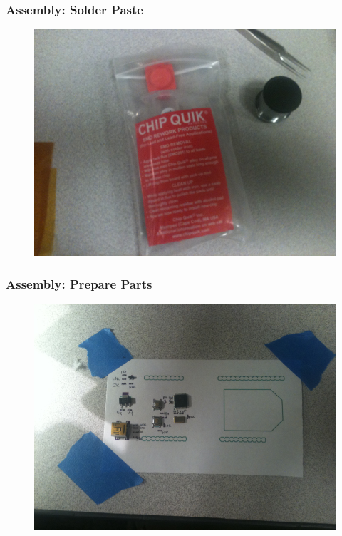 \documentclass{beamer}
\begin{document}
\begin{frame}
\frametitle{Assembly: Solder Paste}
\begin{figure}
\includegraphics[width=0.8\linewidth]{assemble10.png}
\end{figure}
\end{frame}


\begin{frame}
\frametitle{Assembly: Prepare Parts}
\begin{figure}
\includegraphics[width=0.8\linewidth]{assemble9.png}
\end{figure}
\end{frame}

\end{document}

